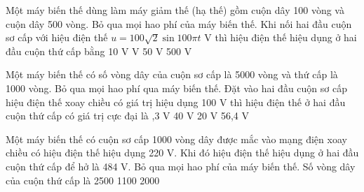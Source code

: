 \begin{vidu} %
	Một máy biến thế dùng làm máy giảm thế (hạ thế) gồm cuộn dây 100 vòng và cuộn dây 500 vòng. Bỏ qua mọi hao phí của máy biến thế. Khi nối hai đầu cuộn sơ cấp với hiệu điện thế $u = 100\sqrt{2}\sin100\pi  t$  V thì hiệu điện thế hiệu dụng ở hai đầu cuộn thứ cấp bằng
	\choice
	{10 V}
	{ V}
	{50 V}
	{500 V}
\end{vidu}
\begin{vidu} %
	Một máy biến thế có số vòng dây của cuộn sơ cấp là 5000 vòng và thứ cấp là 1000 vòng. Bỏ qua mọi hao phí qua máy biến thế. Đặt vào hai đầu cuộn sơ cấp hiệu điện thế xoay chiều có giá trị hiệu dụng 100 V thì hiệu điện thế ở hai đầu cuộn thứ cấp có giá trị cực đại là
	\choice
	{,3 V}
	{40 V}
	{20 V}
	{56,4 V}
\end{vidu}
\begin{vidu} %
	Một máy biến thế có cuộn sơ cấp 1000 vòng dây được mắc vào mạng điện xoay chiều có hiệu điện thế hiệu dụng 220 V. Khi đó hiệu điện thế hiệu dụng ở hai đầu cuộn thứ cấp để hở là 484 V. Bỏ qua mọi hao phí của máy biến thế. Số vòng dây của cuộn thứ cấp là
	\choice
	{2500}
	{1100}
	{2000}
	{}
\end{vidu}
